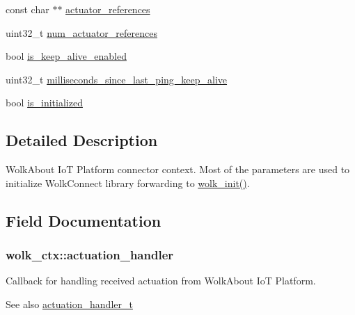 \begin{DoxyCompactItemize}
\item 
const char $\ast$$\ast$ \hyperlink{structwolk__ctx_aa2127e8414d0d9c6214343891f4a322f}{actuator\+\_\+references}
\item 
uint32\+\_\+t \hyperlink{structwolk__ctx_a23e98a97649d679e4a85c87f2da1f8e5}{num\+\_\+actuator\+\_\+references}
\item 
bool \hyperlink{structwolk__ctx_ab195921b22d85b2e46df09cca001f5e2}{is\+\_\+keep\+\_\+alive\+\_\+enabled}
\item 
uint32\+\_\+t \hyperlink{structwolk__ctx_a2d93b135a08863cedae25012a6dc8d46}{milliseconds\+\_\+since\+\_\+last\+\_\+ping\+\_\+keep\+\_\+alive}
\item 
bool \hyperlink{structwolk__ctx_ae0a13a533a7c9ffc516eda95cd6ed324}{is\+\_\+initialized}
\end{DoxyCompactItemize}


\subsection{Detailed Description}
Wolk\+About IoT Platform connector context. Most of the parameters are used to initialize Wolk\+Connect library forwarding to \hyperlink{wolk__connector_8h_a607b5439ae7741284a73312b7794fa7a}{wolk\+\_\+init()}. 

\subsection{Field Documentation}
\subsubsection[{\texorpdfstring{actuation\+\_\+handler}{actuation_handler}}]{ wolk\+\_\+ctx\+::actuation\+\_\+handler}\hypertarget{structwolk__ctx_a2ab241133283e361c6822409f7ec48ca}{}\label{structwolk__ctx_a2ab241133283e361c6822409f7ec48ca}
Callback for handling received actuation from Wolk\+About IoT Platform. \begin{DoxySeeAlso}{See also}
\hyperlink{wolk__connector_8h_acde87869e807b1774680f3f2b5b04e2f}{actuation\+\_\+handler\+\_\+t} 
\end{DoxySeeAlso}
